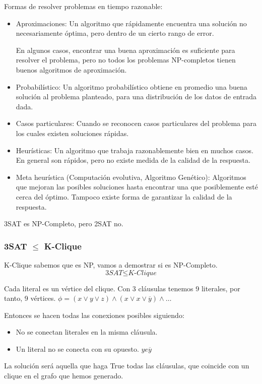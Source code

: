 Formas de resolver problemas en tiempo razonable:
\begin{itemize}
  \item Aproximaciones: Un algoritmo que rápidamente encuentra una solución no necesariamente óptima, pero dentro de un cierto rango de error.
  
  En algunos casos, encontrar una buena aproximación es suficiente para resolver el problema, pero no todos los problemas NP-completos tienen buenos algoritmos de aproximación.
  \item Probabilístico: Un algoritmo probabilístico obtiene en promedio una buena solución al problema planteado, para una distribución de los datos de entrada dada.
  \item Casos particulares: Cuando se reconocen casos particulares del problema para los cuales existen soluciones rápidas.
  \item Heurísticas: Un algoritmo que trabaja razonablemente bien en muchos casos. En general son rápidos, pero no existe medida de la calidad de la respuesta.
  \item Meta heurística (Computación evolutiva, Algoritmo Genético): Algoritmos que mejoran las posibles soluciones hasta encontrar una que posiblemente esté cerca del óptimo. Tampoco existe forma de garantizar la calidad de la respuesta.
\end{itemize}

3SAT es NP-Completo, pero 2SAT no.

\subsubsection{3SAT $\leq$ K-Clique}
K-Clique sabemos que es NP, vamos a demostrar si es NP-Completo.
$$\textit{3SAT} \leq \textit{K-Clique}$$

Cada literal es un vértice del clique. Con 3 cláusulas tenemos 9 literales, por tanto, 9 vértices. $\phi=(x\vee y \vee z) \wedge (x\vee x \vee \overline{y}) \wedge \dots$

Entonces se hacen todas las conexiones posibles siguiendo:
\begin{itemize}
  \item No se conectan literales en la misma cláusula.
  \item Un literal no se conecta con su opuesto. $y e \overline{y}$
\end{itemize}

La solución será aquella que haga True todas las cláusulas, que coincide con un clique en el grafo que hemos generado.

